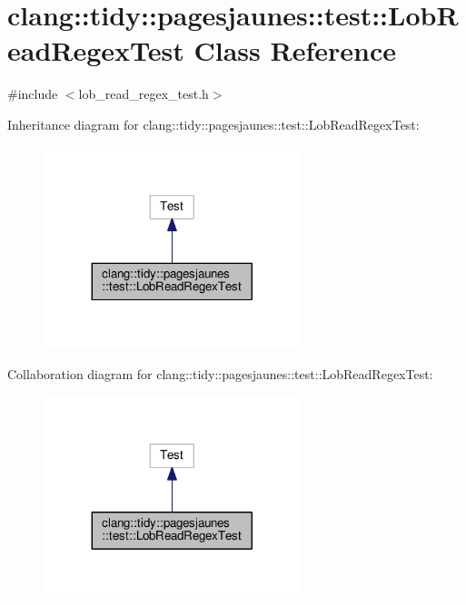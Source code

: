 \hypertarget{classclang_1_1tidy_1_1pagesjaunes_1_1test_1_1_lob_read_regex_test}{}\section{clang\+:\+:tidy\+:\+:pagesjaunes\+:\+:test\+:\+:Lob\+Read\+Regex\+Test Class Reference}
\label{classclang_1_1tidy_1_1pagesjaunes_1_1test_1_1_lob_read_regex_test}


{\ttfamily \#include $<$lob\+\_\+read\+\_\+regex\+\_\+test.\+h$>$}



Inheritance diagram for clang\+:\+:tidy\+:\+:pagesjaunes\+:\+:test\+:\+:Lob\+Read\+Regex\+Test\+:
\nopagebreak
\begin{figure}[H]
\begin{center}
\leavevmode
\includegraphics[width=212pt]{classclang_1_1tidy_1_1pagesjaunes_1_1test_1_1_lob_read_regex_test__inherit__graph}
\end{center}
\end{figure}


Collaboration diagram for clang\+:\+:tidy\+:\+:pagesjaunes\+:\+:test\+:\+:Lob\+Read\+Regex\+Test\+:
\nopagebreak
\begin{figure}[H]
\begin{center}
\leavevmode
\includegraphics[width=212pt]{classclang_1_1tidy_1_1pagesjaunes_1_1test_1_1_lob_read_regex_test__coll__graph}
\end{center}
\end{figure}
